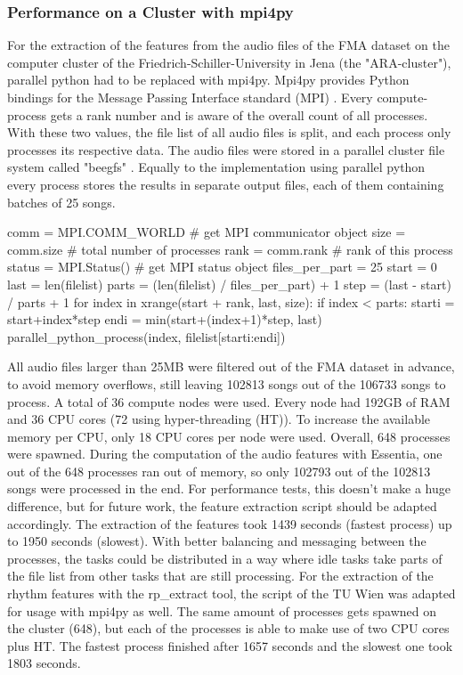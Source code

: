 \subsubsection{Performance on a Cluster with mpi4py}\label{mpi4py}

For the extraction of the features from the audio files of the FMA dataset on the computer cluster of the Friedrich-Schiller-University in Jena (the "ARA-cluster"), parallel python had to be replaced with mpi4py. 
Mpi4py provides Python bindings for the Message Passing Interface standard (MPI) \cite{mpi4py}. 
Every compute-process gets a rank number and is aware of the overall count of all processes. With these two values, the file list of all audio files is split, and each process only processes its respective data. The audio files were stored in a parallel cluster file system called "beegfs" \cite{beegfs}. Equally to the implementation using parallel python every process stores the results in separate output files, each of them containing batches of 25 songs.\\

\begin{pythonCode}[frame=single,label={lst:mpi4py},caption={Mpi4py},captionpos=b]
comm = MPI.COMM_WORLD   # get MPI communicator object
size = comm.size        # total number of processes
rank = comm.rank        # rank of this process
status = MPI.Status()   # get MPI status object
files_per_part = 25
start = 0
last = len(filelist)
parts = (len(filelist) / files_per_part) + 1
step = (last - start) / parts + 1
for index in xrange(start + rank, last, size):
    if index < parts:        
        starti = start+index*step
        endi = min(start+(index+1)*step, last)
        parallel_python_process(index, filelist[starti:endi])
\end{pythonCode}

\noindent All audio files larger than 25MB were filtered out of the FMA dataset in advance, to avoid memory overflows, still leaving 102813 songs out of the 106733 songs to process. A total of 36 compute nodes were used. Every node had 192GB of RAM and 36 CPU cores (72 using hyper-threading (HT)). To increase the available memory per CPU, only 18 CPU cores per node were used. Overall, 648 processes were spawned. During the computation of the audio features with Essentia, one out of the 648 processes ran out of memory, so only 102793 out of the 102813 songs were processed in the end. For performance tests, this doesn't make a huge difference, but for future work, the feature extraction script should be adapted accordingly. 
The extraction of the features took 1439 seconds (fastest process) up to 1950 seconds (slowest). With better balancing and messaging between the processes, the tasks could be distributed in a way where idle tasks take parts of the file list from other tasks that are still processing. 
\noindent For the extraction of the rhythm features with the rp\_extract tool, the script of the TU Wien was adapted for usage with mpi4py as well. The same amount of processes gets spawned on the cluster (648), but each of the processes is able to make use of two CPU cores plus HT. The fastest process finished after 1657 seconds and the slowest one took 1803 seconds.

